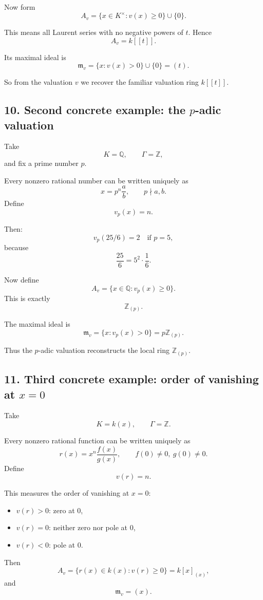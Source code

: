 \documentclass[12pt,a4paper]{article}
\theoremstyle{notespace}
\begin{document}
Now form
\[
A_v=\{x\in K^\times : v(x)\ge 0\}\cup\{0\}.
\]

This means all Laurent series with no negative powers of \(t\). Hence
\[
A_v=k[[t]].
\]

Its maximal ideal is
\[
\mathfrak m_v=\{x : v(x)>0\}\cup\{0\}=(t).
\]

So from the valuation \(v\) we recover the familiar valuation ring \(k[[t]]\).

\subsection{10. Second concrete example: the \(p\)-adic valuation}

Take
\[
K=\mathbb Q,
\qquad
\Gamma=\mathbb Z,
\]
and fix a prime number \(p\).

Every nonzero rational number can be written uniquely as
\[
x=p^n\frac ab,
\qquad
p\nmid a,b.
\]
Define
\[
v_p(x)=n.
\]

Then:
\[
v_p(25/6)=2 \quad \text{if } p=5,
\]
because
\[
\frac{25}{6}=5^2\cdot \frac{1}{6}.
\]

Now define
\[
A_v=\{x\in \mathbb Q : v_p(x)\ge 0\}.
\]
This is exactly
\[
\mathbb Z_{(p)}.
\]

The maximal ideal is
\[
\mathfrak m_v=\{x : v_p(x)>0\}=p\mathbb Z_{(p)}.
\]

Thus the \(p\)-adic valuation reconstructs the local ring \(\mathbb Z_{(p)}\).

\subsection{11. Third concrete example: order of vanishing at \(x=0\)}

Take
\[
K=k(x),
\qquad
\Gamma=\mathbb Z.
\]

Every nonzero rational function can be written uniquely as
\[
r(x)=x^n\frac{f(x)}{g(x)},
\qquad
f(0)\neq 0,\ g(0)\neq 0.
\]
Define
\[
v(r)=n.
\]

This measures the order of vanishing at \(x=0\):
\begin{itemize}
	\item \(v(r)>0\): zero at \(0\),
	\item \(v(r)=0\): neither zero nor pole at \(0\),
	\item \(v(r)<0\): pole at \(0\).
\end{itemize}

Then
\[
A_v=\{r(x)\in k(x): v(r)\ge 0\}=k[x]_{(x)},
\]
and
\[
\mathfrak m_v=(x).
\]
\end{document}
